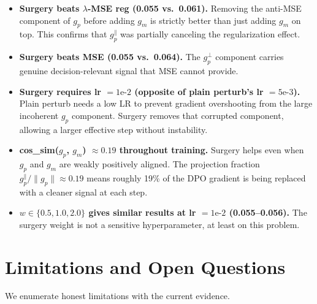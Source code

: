\documentclass[11pt]{article}
\begin{document}
\begin{itemize}[itemsep=4pt]
  \item \textbf{Surgery beats $\lambda$-MSE reg (0.055 vs.\ 0.061).}  Removing
        the anti-MSE component of $g_p$ before adding $g_m$ is strictly better
        than just adding $g_m$ on top.  This confirms that $g_p^{\parallel}$ was
        partially canceling the regularization effect.

  \item \textbf{Surgery beats MSE (0.055 vs.\ 0.064).}  The $g_p^{\perp}$
        component carries genuine decision-relevant signal that MSE cannot provide.

  \item \textbf{Surgery requires lr $= 1\text{e-}2$ (opposite of plain
        perturb's lr $= 5\text{e-}3$).}  Plain perturb needs a low LR to prevent
        gradient overshooting from the large incoherent $g_p$ component.  Surgery
        removes that corrupted component, allowing a larger effective step without
        instability.

  \item \textbf{cos\_sim($g_p$, $g_m$) $\approx 0.19$ throughout training.}
        Surgery helps even when $g_p$ and $g_m$ are weakly positively aligned.
        The projection fraction $g_p^{\parallel} / \|g_p\| \approx 0.19$ means
        roughly 19\% of the DPO gradient is being replaced with a cleaner signal
        at each step.

  \item \textbf{$w \in \{0.5, 1.0, 2.0\}$ gives similar results at lr $= 1\text{e-}2$
        (0.055--0.056).}  The surgery weight is not a sensitive hyperparameter,
        at least on this problem.
\end{itemize}

\section{Limitations and Open Questions}

We enumerate honest limitations with the current evidence.
\end{document}
